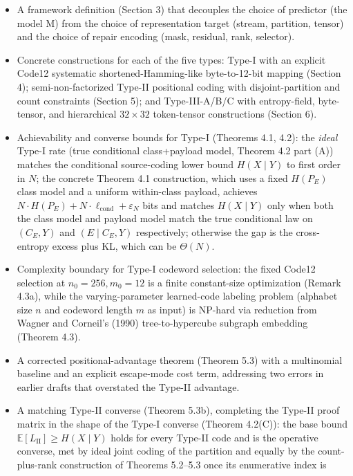 \documentclass[
]{article}
\begin{document}
\begin{itemize}
\item
  A framework definition (Section 3) that decouples the choice of
  predictor (the model M) from the choice of representation target
  (stream, partition, tensor) and the choice of repair encoding (mask,
  residual, rank, selector).
\item
  Concrete constructions for each of the five types: Type-I with an
  explicit Code12 systematic shortened-Hamming-like byte-to-12-bit
  mapping (Section 4); semi-non-factorized Type-II positional coding
  with disjoint-partition and count constraints (Section 5); and
  Type-III-A/B/C with entropy-field, byte-tensor, and hierarchical
  $32 \times 32$ token-tensor constructions (Section 6).
\item
  Achievability and converse bounds for Type-I (Theorems 4.1, 4.2):
  the \emph{ideal} Type-I rate (true conditional class+payload
  model, Theorem 4.2 part (A)) matches the conditional source-coding
  lower bound $H(X \mid Y)$ to first order in $N$; the concrete
  Theorem 4.1 construction, which uses a fixed $H(P_E)$ class model
  and a uniform within-class payload, achieves
  $N \cdot H(P_E) + N \cdot \ell_{\text{cond}} + \varepsilon_N$
  bits and matches $H(X \mid Y)$ only when both the class model and
  payload model match the true conditional law on $(C_E, Y)$ and
  $(E \mid C_E, Y)$ respectively; otherwise the gap is the
  cross-entropy excess plus KL, which can be $\Theta(N)$.
\item
  Complexity boundary for Type-I codeword selection: the fixed
  Code12 selection at $n_0 = 256, m_0 = 12$ is a finite constant-size
  optimization (Remark 4.3a), while the varying-parameter
  learned-code labeling problem (alphabet size $n$ and codeword
  length $m$ as input) is NP-hard via reduction from Wagner and
  Corneil's (1990) tree-to-hypercube subgraph embedding (Theorem 4.3).
\item
  A corrected positional-advantage theorem (Theorem 5.3) with a
  multinomial baseline and an explicit escape-mode cost term,
  addressing two errors in earlier drafts that overstated the
  Type-II advantage.
\item
  A matching Type-II converse (Theorem 5.3b), completing the Type-II
  proof matrix in the shape of the Type-I converse (Theorem 4.2(C)):
  the base bound $\mathbb{E}[L_{\mathrm{II}}] \geq H(X \mid Y)$ holds
  for every Type-II code and is the operative converse, met by ideal
  joint coding of the partition and equally by the count-plus-rank
  construction of Theorems 5.2--5.3 once its enumerative index is

\end{itemize}
\end{document}
